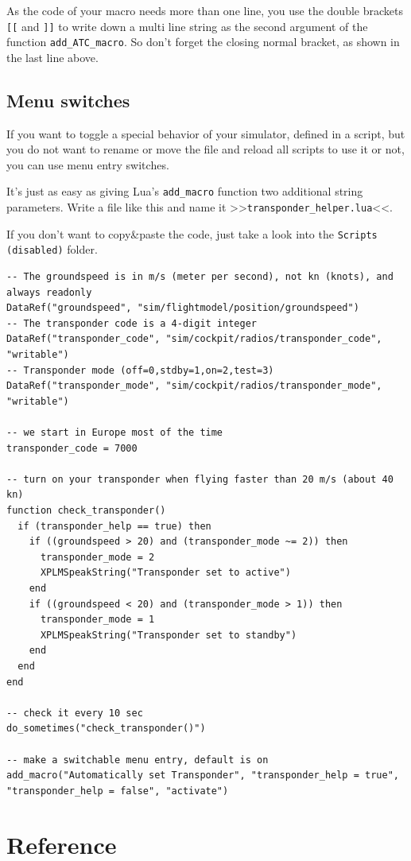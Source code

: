 \documentclass[11pt,parskip=half,a4paper]{scrartcl}
\begin{document}
As the code of your macro needs more than one line, you use the double brackets \verb|[[| and \verb|]]| to write down a multi line string as the second argument of the function \verb|add_ATC_macro|. So don't forget the closing normal bracket, as shown in the last line above.

\subsection{Menu switches}

If you want to toggle a special behavior of your simulator, defined in a script, but you do not want to rename or move the file and reload all scripts to use it or not, you can use menu entry switches.

It's just as easy as giving Lua's \verb|add_macro| function two additional string parameters. Write a file like this and name it >>\verb|transponder_helper.lua|<<.

If you don't want to copy\&paste the code, just take a look into the \verb|Scripts (disabled)| folder.

\begin{lstlisting}
-- The groundspeed is in m/s (meter per second), not kn (knots), and always readonly
DataRef("groundspeed", "sim/flightmodel/position/groundspeed")
-- The transponder code is a 4-digit integer
DataRef("transponder_code", "sim/cockpit/radios/transponder_code", "writable")
-- Transponder mode (off=0,stdby=1,on=2,test=3)
DataRef("transponder_mode", "sim/cockpit/radios/transponder_mode", "writable")

-- we start in Europe most of the time
transponder_code = 7000

-- turn on your transponder when flying faster than 20 m/s (about 40 kn)
function check_transponder()
  if (transponder_help == true) then
    if ((groundspeed > 20) and (transponder_mode ~= 2)) then
      transponder_mode = 2
      XPLMSpeakString("Transponder set to active")
    end
    if ((groundspeed < 20) and (transponder_mode > 1)) then
      transponder_mode = 1
      XPLMSpeakString("Transponder set to standby")
    end
  end
end

-- check it every 10 sec
do_sometimes("check_transponder()")

-- make a switchable menu entry, default is on
add_macro("Automatically set Transponder", "transponder_help = true", "transponder_help = false", "activate")
\end{lstlisting}

\newpage
\section{Reference}
\end{document}
